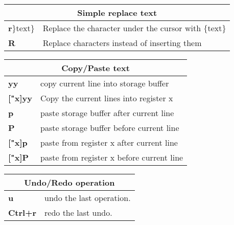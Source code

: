 \begin{table}[h]
\centering
\footnotesize
\begin{tabular}{|l|l|}
\multicolumn{2}{c}{\textbf{Simple replace text}}\\
\hline
{\textbf{r}$\rbrace$text$\rbrace$}	& {Replace the character under the cursor with $\lbrace$text$\rbrace$}\\
\hline
\textbf{R}	& {Replace characters instead of inserting them}\\
\hline
\end{tabular}
\end{table}

\begin{table}[h]
\centering
\footnotesize
\begin{tabular}{|l|l|}
\multicolumn{2}{c}{\textbf{Copy/Paste text}}\\
\hline
\textbf{yy}	& {copy current line into storage buffer}\\
\hline
\textbf{["x]yy}& {	Copy the current lines into register x}\\
\hline
\textbf{p}	& {paste storage buffer after current line}\\
\hline
\textbf{P}	& {paste storage buffer before current line}\\
\hline
\textbf{["x]p}	& {paste from register x after current line}\\
\hline
\textbf{["x]P}	& {paste from register x before current line}\\
\hline
\end{tabular}
\end{table}


\begin{table}[h]
\centering
\footnotesize
\begin{tabular}{|l|l|}
\multicolumn{2}{c}{\textbf{Undo/Redo operation}}\\
\hline
\textbf{u}	& {undo the last operation.}\\
\hline
\textbf{Ctrl+r}	& {redo the last undo.}\\
\hline
\end{tabular}
\end{table}


